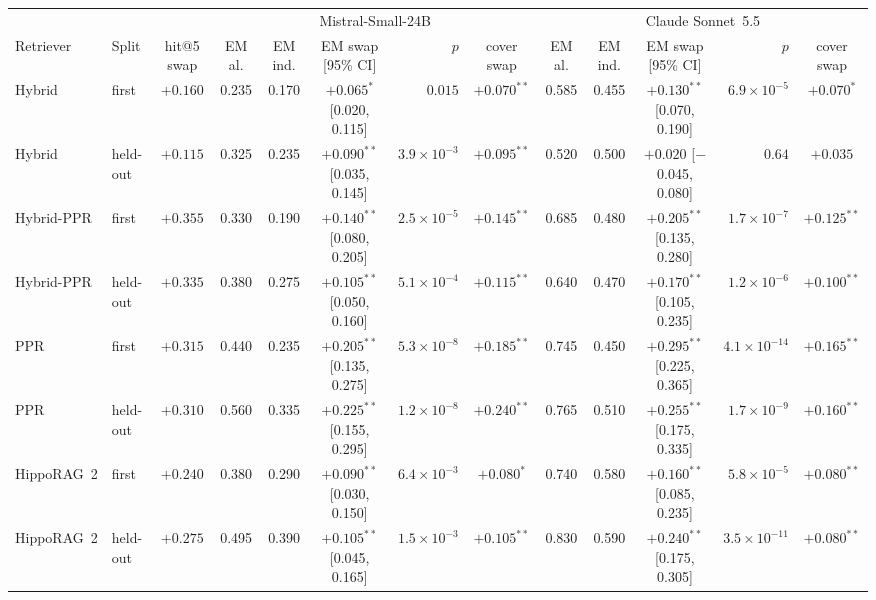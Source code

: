 \begin{tabular}{llccccrccccrc}
\toprule
 & & & \multicolumn{5}{c}{Mistral-Small-24B} & \multicolumn{5}{c}{Claude Sonnet~5.5}\\
\cmidrule(lr){4-8}\cmidrule(lr){9-13}
Retriever & Split & hit@5 swap & EM al. & EM ind. & EM swap [95\% CI] & $p$ & cover swap & EM al. & EM ind. & EM swap [95\% CI] & $p$ & cover swap\\
\midrule
Hybrid & first & $+0.160$ & 0.235 & 0.170 & $+0.065^{*}$ [0.020, 0.115] & $0.015$ & $+0.070^{**}$ & 0.585 & 0.455 & $+0.130^{**}$ [0.070, 0.190] & $6.9\times10^{-5}$ & $+0.070^{*}$\\
Hybrid & held-out & $+0.115$ & 0.325 & 0.235 & $+0.090^{**}$ [0.035, 0.145] & $3.9\times10^{-3}$ & $+0.095^{**}$ & 0.520 & 0.500 & $+0.020$ [$-$0.045, 0.080] & $0.64$ & $+0.035$\\
Hybrid-PPR & first & $+0.355$ & 0.330 & 0.190 & $+0.140^{**}$ [0.080, 0.205] & $2.5\times10^{-5}$ & $+0.145^{**}$ & 0.685 & 0.480 & $+0.205^{**}$ [0.135, 0.280] & $1.7\times10^{-7}$ & $+0.125^{**}$\\
Hybrid-PPR & held-out & $+0.335$ & 0.380 & 0.275 & $+0.105^{**}$ [0.050, 0.160] & $5.1\times10^{-4}$ & $+0.115^{**}$ & 0.640 & 0.470 & $+0.170^{**}$ [0.105, 0.235] & $1.2\times10^{-6}$ & $+0.100^{**}$\\
PPR & first & $+0.315$ & 0.440 & 0.235 & $+0.205^{**}$ [0.135, 0.275] & $5.3\times10^{-8}$ & $+0.185^{**}$ & 0.745 & 0.450 & $+0.295^{**}$ [0.225, 0.365] & $4.1\times10^{-14}$ & $+0.165^{**}$\\
PPR & held-out & $+0.310$ & 0.560 & 0.335 & $+0.225^{**}$ [0.155, 0.295] & $1.2\times10^{-8}$ & $+0.240^{**}$ & 0.765 & 0.510 & $+0.255^{**}$ [0.175, 0.335] & $1.7\times10^{-9}$ & $+0.160^{**}$\\
HippoRAG~2 & first & $+0.240$ & 0.380 & 0.290 & $+0.090^{**}$ [0.030, 0.150] & $6.4\times10^{-3}$ & $+0.080^{*}$ & 0.740 & 0.580 & $+0.160^{**}$ [0.085, 0.235] & $5.8\times10^{-5}$ & $+0.080^{**}$\\
HippoRAG~2 & held-out & $+0.275$ & 0.495 & 0.390 & $+0.105^{**}$ [0.045, 0.165] & $1.5\times10^{-3}$ & $+0.105^{**}$ & 0.830 & 0.590 & $+0.240^{**}$ [0.175, 0.305] & $3.5\times10^{-11}$ & $+0.080^{**}$\\
\bottomrule
\end{tabular}
